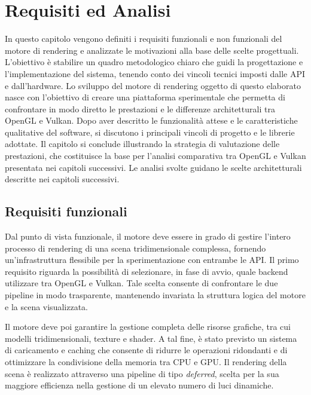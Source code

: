 \documentclass[12pt,a4paper,openright,twoside]{book}
\begin{document}
\chapter{Requisiti ed Analisi}
\label{chap:analisi}
\noindent
In questo capitolo vengono definiti i requisiti funzionali e non funzionali del motore di rendering 
e analizzate le motivazioni alla base delle scelte progettuali.
L'obiettivo è stabilire un quadro metodologico chiaro che guidi la progettazione e l'implementazione del sistema,
tenendo conto dei vincoli tecnici imposti dalle API e dall'hardware.
Lo sviluppo del motore di rendering oggetto di questo elaborato nasce con l'obiettivo di creare una piattaforma
sperimentale che permetta di confrontare in modo diretto le prestazioni e le differenze architetturali tra
OpenGL e Vulkan.
Dopo aver descritto le funzionalità attese e le caratteristiche qualitative del software,
si discutono i principali vincoli di progetto e le librerie adottate.
Il capitolo si conclude illustrando la strategia di valutazione delle prestazioni,
che costituisce la base per l'analisi comparativa tra OpenGL e Vulkan presentata nei capitoli successivi.
Le analisi svolte guidano le scelte architetturali descritte nei capitoli successivi.

\section{Requisiti funzionali}
Dal punto di vista funzionale, il motore deve essere in grado di gestire l'intero processo di rendering di una
scena tridimensionale complessa, fornendo un'infrastruttura flessibile per la sperimentazione con entrambe le API.
Il primo requisito riguarda la possibilità di selezionare, in fase di avvio, quale backend utilizzare tra OpenGL e
Vulkan. Tale scelta consente di confrontare le due pipeline in modo trasparente, mantenendo invariata la struttura
logica del motore e la scena visualizzata.

Il motore deve poi garantire la gestione completa delle risorse grafiche, tra cui modelli tridimensionali, texture e
shader. A tal fine, è stato previsto un sistema di caricamento e caching che consente di ridurre le operazioni ridondanti
e di ottimizzare la condivisione della memoria tra CPU e GPU. Il rendering della scena è realizzato attraverso una
pipeline di tipo \emph{deferred}, scelta per la sua maggiore efficienza nella gestione di un elevato numero di luci
dinamiche.
\end{document}
